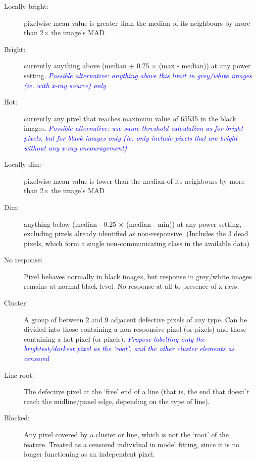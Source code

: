 \documentclass[10pt,fleqn]{article}
\begin{document}
\begin{footnotesize}
\begin{description}
\item[Locally bright:] pixelwise mean value is greater than the median of its neighbours by more than 2$\times$ the image's MAD

\item[Bright:] currently anything above (median + 0.25 $\times$ (max - median)) at any power setting. \emph{\textcolor{blue}{Possible alternative: anything above this limit in grey/white images (ie. with x-ray source) only}}

\item[Hot:] currently any pixel that reaches maximum value of 65535 in the black images. \emph{\textcolor{blue}{Possible alternative: use same threshold calculation as for bright pixels, but for black images only (ie. only include pixels that are bright without any x-ray encouragement)}}

\item[Locally dim:] pixelwise mean value is lower than the median of its neighbours by more than 2$\times$ the image's MAD

\item[Dim:] anything below (median - 0.25 $\times$ (median - min)) at any power setting, excluding pixels already identified as non-responsive. (Includes the 3 dead pixels, which form a single non-communicating class in the available data)

\item[No response:] Pixel behaves normally in black images, but response in grey/white images remains at normal black level. No response at all to presence of x-rays.

\item[Cluster:] A group of between 2 and 9 adjacent defective pixels of any type. Can be divided into those containing a non-responsive pixel (or pixels) and those containing a hot pixel (or pixels). \emph{\textcolor{blue}{Propose labelling only the brightest/darkest pixel as the `root', and the other cluster elements as censored}}

\item[Line root:] The defective pixel at the `free' end of a line (that is, the end that doesn't reach the midline/panel edge, depending on the type of line).

\item[Blocked:] Any pixel covered by a cluster or line, which is not the `root' of the feature. Treated as a censored individual in model fitting, since it is no longer functioning as an independent pixel.

\end{description}
\end{footnotesize}
\end{document}
